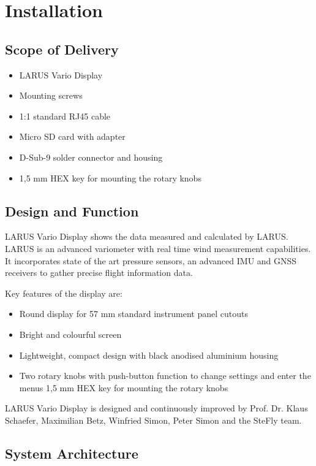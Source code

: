 \section{Installation}

\subsection{Scope of Delivery}
\begin{itemize}
	\item 	LARUS Vario Display
	\item 	Mounting screws
	\item 	1:1 standard RJ45 cable
	\item 	Micro SD card with adapter
	\item 	D-Sub-9 solder connector and housing
	\item 	1,5 mm HEX key for mounting the rotary knobs
\end{itemize}

\subsection{Design and Function}

LARUS Vario Display shows the data measured and calculated by LARUS. LARUS is an advanced
variometer with real time wind measurement capabilities. It incorporates state of the art pressure
sensors, an advanced IMU and GNSS receivers to gather precise flight information data.

Key features of the display are:
\begin{itemize}
	\item 	Round display for 57 mm standard instrument panel cutouts
	\item 	Bright and colourful screen
	\item 	Lightweight, compact design with black anodised aluminium housing
	\item 	Two rotary knobs with push-button function to change settings and enter the menus
1,5 mm HEX key for mounting the rotary knobs
\end{itemize}

LARUS Vario Display is designed and continuously improved by Prof. Dr. Klaus Schaefer, Maximilian
Betz, Winfried Simon, Peter Simon and the SteFly team.


\subsection{System Architecture}


